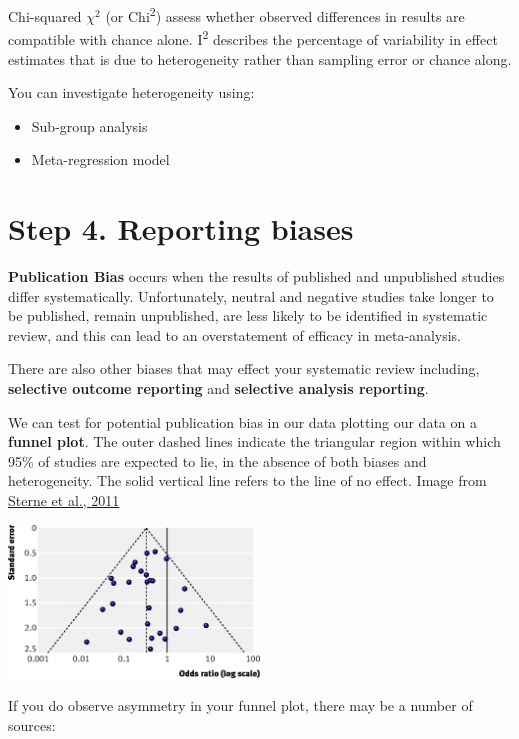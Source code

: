 \documentclass[
]{book}
\providecommand{\tightlist}{%
  \setlength{\itemsep}{0pt}\setlength{\parskip}{0pt}}
\begin{document}
Chi-squared \(\chi^2\) (or Chi\textsuperscript{2}) assess whether observed differences in results are compatible with chance alone.
I\textsuperscript{2} describes the percentage of variability in effect estimates that is due to heterogeneity rather than sampling error or chance along.

You can investigate heterogeneity using:

\begin{itemize}
\tightlist
\item
  Sub-group analysis
\item
  Meta-regression model
\end{itemize}

\hypertarget{step-4.-reporting-biases}{%
\section{Step 4. Reporting biases}\label{step-4.-reporting-biases}}

\textbf{Publication Bias} occurs when the results of published and unpublished studies differ systematically. Unfortunately, neutral and negative studies take longer to be published, remain unpublished, are less likely to be identified in systematic review, and this can lead to an overstatement of efficacy in meta-analysis.

There are also other biases that may effect your systematic review including, \textbf{selective outcome reporting} and \textbf{selective analysis reporting}.

We can test for potential publication bias in our data plotting our data on a \textbf{funnel plot}.
The outer dashed lines indicate the triangular region within which 95\% of studies are expected to lie, in the absence of both biases and heterogeneity. The solid vertical line refers to the line of no effect. Image from \href{https://www.bmj.com/content/343/bmj.d4002}{Sterne et al., 2011}

\includegraphics[width=0.5\textwidth,height=\textheight]{figs/funnelplot.jpg}

If you do observe asymmetry in your funnel plot, there may be a number of sources:
\end{document}
